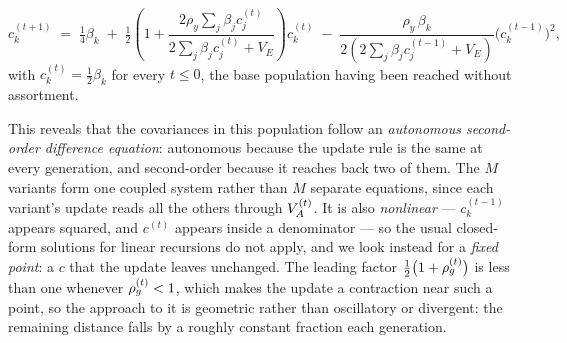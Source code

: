 \documentclass[12pt]{article}
\begin{document}
\begin{equation}\label{eq:c-closed}
    c^{(t+1)}_k \;=\; \tfrac14\beta_k
    \;+\; \tfrac12\left(1 + \frac{2\rho_y\sum_j \beta_j c^{(t)}_j}{2\sum_j \beta_j c^{(t)}_j + V_E}\right) c^{(t)}_k
    \;-\; \frac{\rho_y\,\beta_k}{2\left(2\sum_j \beta_j c^{(t-1)}_j + V_E\right)} \big(c^{(t-1)}_k\big)^2 ,
\end{equation}
with $c^{(t)}_k = \tfrac12\beta_k$ for every $t \leq 0$, the base population having been reached without assortment.

This reveals that the covariances in this population follow an \emph{autonomous second-order difference equation}: autonomous because the update rule is the same at every generation, and second-order because it reaches back two of them.
The $M$ variants form one coupled system rather than $M$ separate equations, since each variant's update reads all the others through $V_A^{(t)}$.
It is also \emph{nonlinear} --- $c^{(t-1)}_k$ appears squared, and $c^{(t)}$ appears inside a denominator --- so the usual closed-form solutions for linear recursions do not apply, and we look instead for a \emph{fixed point}: a $c$ that the update leaves unchanged.
The leading factor $\tfrac12\big(1 + \rho_g^{(t)}\big)$ is less than one whenever $\rho_g^{(t)} < 1$, which makes the update a contraction near such a point, so the approach to it is geometric rather than oscillatory or divergent: the remaining distance falls by a roughly constant fraction each generation.
\end{document}
